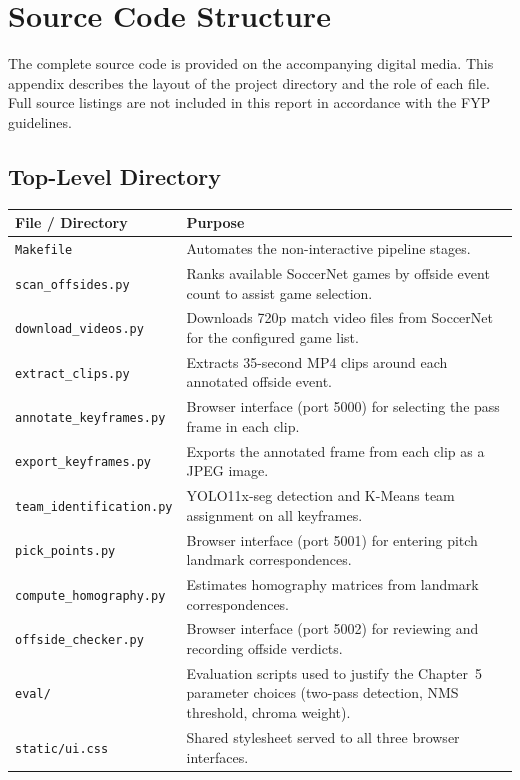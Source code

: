 \chapter{Source Code Structure}%
\label{app:code}

The complete source code is provided on the accompanying digital media. This appendix describes the layout of the project directory and the role of each file. Full source listings are not included in this report in accordance with the FYP guidelines.

\section*{Top-Level Directory}

\begin{tabularx}{\linewidth}{lX}
\hline
File / Directory & Purpose \\
\hline
\texttt{Makefile} & Automates the non-interactive pipeline stages. \\
\texttt{scan\_offsides.py} & Ranks available SoccerNet games by offside event count to assist game selection. \\
\texttt{download\_videos.py} & Downloads 720p match video files from SoccerNet for the configured game list. \\
\texttt{extract\_clips.py} & Extracts 35-second MP4 clips around each annotated offside event. \\
\texttt{annotate\_keyframes.py} & Browser interface (port 5000) for selecting the pass frame in each clip. \\
\texttt{export\_keyframes.py} & Exports the annotated frame from each clip as a JPEG image. \\
\texttt{team\_identification.py} & YOLO11x-seg detection and K-Means team assignment on all keyframes. \\
\texttt{pick\_points.py} & Browser interface (port 5001) for entering pitch landmark correspondences. \\
\texttt{compute\_homography.py} & Estimates homography matrices from landmark correspondences. \\
\texttt{offside\_checker.py} & Browser interface (port 5002) for reviewing and recording offside verdicts. \\
\texttt{eval/} & Evaluation scripts used to justify the Chapter~5 parameter choices (two-pass detection, NMS threshold, chroma weight). \\
\texttt{static/ui.css} & Shared stylesheet served to all three browser interfaces. \\
\hline
\end{tabularx}

